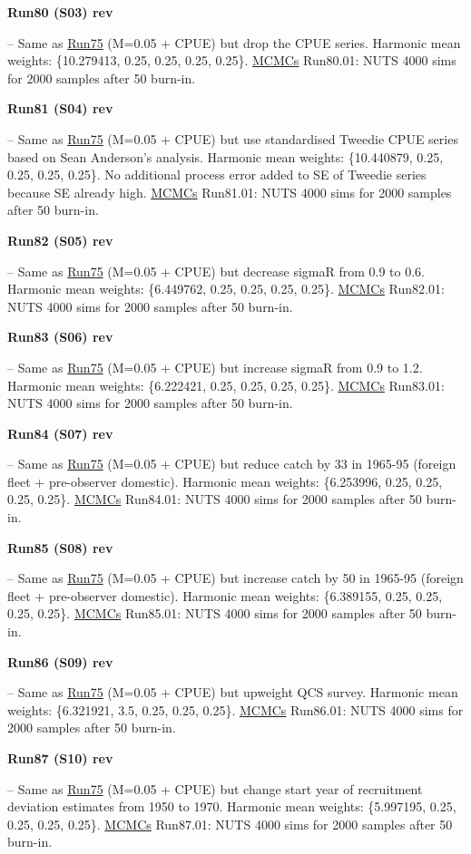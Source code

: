 \hypertarget{R80}{\textbf{Run80 (S03) rev}} -- Same as \hyperlink{R75}{Run75} (M=0.05 + CPUE) but drop the CPUE series.  Harmonic mean weights: \{10.279413, 0.25, 0.25, 0.25, 0.25\}. \underline{MCMCs} Run80.01: NUTS 4000 sims for 2000 samples after 50\pc{} burn-in.

\hypertarget{R81}{\textbf{Run81 (S04) rev}} -- Same as \hyperlink{R75}{Run75} (M=0.05 + CPUE) but use standardised Tweedie CPUE series based on Sean Anderson's analysis. Harmonic mean weights: \{10.440879, 0.25, 0.25, 0.25, 0.25\}. No additional process error added to SE of Tweedie series because SE already high.  \underline{MCMCs} Run81.01: NUTS 4000 sims for 2000 samples after 50\pc{} burn-in.

\hypertarget{R82}{\textbf{Run82 (S05) rev}} -- Same as \hyperlink{R75}{Run75} (M=0.05 + CPUE) but decrease sigmaR from 0.9 to 0.6. Harmonic mean weights: \{6.449762, 0.25, 0.25, 0.25, 0.25\}.  \underline{MCMCs} Run82.01: NUTS 4000 sims for 2000 samples after 50\pc{} burn-in.

\hypertarget{R83}{\textbf{Run83 (S06) rev}} -- Same as \hyperlink{R75}{Run75} (M=0.05 + CPUE) but increase sigmaR from 0.9 to 1.2. Harmonic mean weights: \{6.222421, 0.25, 0.25, 0.25, 0.25\}.  \underline{MCMCs} Run83.01: NUTS 4000 sims for 2000 samples after 50\pc{} burn-in.

\hypertarget{R84}{\textbf{Run84 (S07) rev}} -- Same as \hyperlink{R75}{Run75} (M=0.05 + CPUE) but reduce catch by 33\pc{} in 1965-95 (foreign fleet + pre-observer domestic). Harmonic mean weights: \{6.253996, 0.25, 0.25, 0.25, 0.25\}.  \underline{MCMCs} Run84.01: NUTS 4000 sims for 2000 samples after 50\pc{} burn-in.

\hypertarget{R85}{\textbf{Run85 (S08) rev}} -- Same as \hyperlink{R75}{Run75} (M=0.05 + CPUE) but increase catch by 50\pc{} in 1965-95 (foreign fleet + pre-observer domestic). Harmonic mean weights: \{6.389155, 0.25, 0.25, 0.25, 0.25\}.  \underline{MCMCs} Run85.01: NUTS 4000 sims for 2000 samples after 50\pc{} burn-in.

\hypertarget{R86}{\textbf{Run86 (S09) rev}} -- Same as \hyperlink{R75}{Run75} (M=0.05 + CPUE) but upweight QCS survey. Harmonic mean weights: \{6.321921, 3.5, 0.25, 0.25, 0.25\}.  \underline{MCMCs} Run86.01: NUTS 4000 sims for 2000 samples after 50\pc{} burn-in.

\hypertarget{R87}{\textbf{Run87 (S10) rev}} -- Same as \hyperlink{R75}{Run75} (M=0.05 + CPUE) but change start year of recruitment deviation estimates from 1950 to 1970. Harmonic mean weights: \{5.997195, 0.25, 0.25, 0.25, 0.25\}.  \underline{MCMCs} Run87.01: NUTS 4000 sims for 2000 samples after 50\pc{} burn-in.

